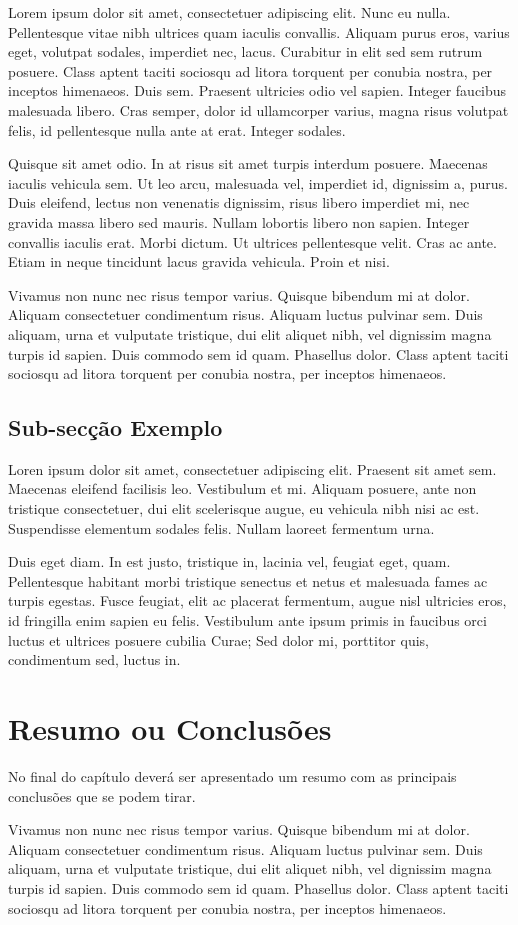 Lorem ipsum dolor sit amet, consectetuer adipiscing elit. Nunc eu
nulla. Pellentesque vitae nibh ultrices quam iaculis
convallis. Aliquam purus eros, varius eget, volutpat sodales,
imperdiet nec, lacus. Curabitur in elit sed sem rutrum posuere. Class
aptent taciti sociosqu ad litora torquent per conubia nostra, per
inceptos himenaeos. Duis sem. Praesent ultricies odio vel
sapien. Integer faucibus malesuada libero. Cras semper, dolor id
ullamcorper varius, magna risus volutpat felis, id pellentesque nulla
ante at erat. Integer sodales. 

Quisque sit amet odio. In at risus sit amet turpis interdum
posuere. Maecenas iaculis vehicula sem. Ut leo arcu, malesuada vel,
imperdiet id, dignissim a, purus. Duis eleifend, lectus non venenatis
dignissim, risus libero imperdiet mi, nec gravida massa libero sed
mauris. Nullam lobortis libero non sapien. Integer convallis iaculis
erat. Morbi dictum. Ut ultrices pellentesque velit. Cras ac
ante. Etiam in neque tincidunt lacus gravida vehicula. Proin et nisi. 

Vivamus non nunc nec risus tempor varius. Quisque bibendum mi at
dolor. Aliquam consectetuer condimentum risus. Aliquam luctus pulvinar
sem. Duis aliquam, urna et vulputate tristique, dui elit aliquet nibh,
vel dignissim magna turpis id sapien. Duis commodo sem id
quam. Phasellus dolor. Class aptent taciti sociosqu ad litora torquent
per conubia nostra, per inceptos himenaeos. 

\subsection{Sub-secção Exemplo}

Loren ipsum dolor sit amet, consectetuer adipiscing elit. 
Praesent sit amet sem. Maecenas eleifend facilisis leo. Vestibulum et
mi. Aliquam posuere, ante non tristique consectetuer, dui elit
scelerisque augue, eu vehicula nibh nisi ac est. Suspendisse elementum
sodales felis. Nullam laoreet fermentum urna. 

Duis eget diam. In est justo, tristique in, lacinia vel, feugiat eget,
quam. Pellentesque habitant morbi tristique senectus et netus et
malesuada fames ac turpis egestas. Fusce feugiat, elit ac placerat
fermentum, augue nisl ultricies eros, id fringilla enim sapien eu
felis. Vestibulum ante ipsum primis in faucibus orci luctus et
ultrices posuere cubilia Curae; Sed dolor mi, porttitor quis,
condimentum sed, luctus in. 

\section{Resumo ou Conclusões}

No final do capítulo deverá ser apresentado um resumo com as 
principais conclusões que se podem tirar. 

Vivamus non nunc nec risus tempor varius. Quisque bibendum mi at
dolor. Aliquam consectetuer condimentum risus. Aliquam luctus pulvinar
sem. Duis aliquam, urna et vulputate tristique, dui elit aliquet nibh,
vel dignissim magna turpis id sapien. Duis commodo sem id
quam. Phasellus dolor. Class aptent taciti sociosqu ad litora torquent
per conubia nostra, per inceptos himenaeos. 
